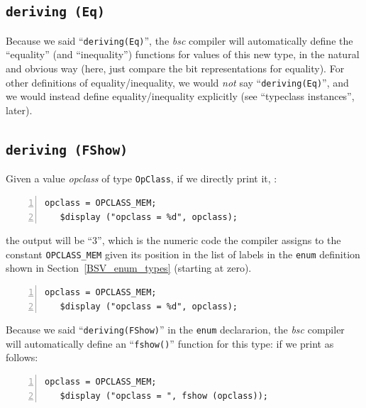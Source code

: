 
\subsection{{\tt deriving (Eq)}}


Because we said ``\verb|deriving(Eq)|'', the \emph{bsc} compiler will
automatically define the ``equality'' (and ``inequality'') functions
for values of this new type, in the natural and obvious way (here,
just compare the bit representations for equality).  For other
definitions of equality/inequality, we would \emph{not} say
``\verb|deriving(Eq)|'', and we would instead define
equality/inequality explicitly (see ``typeclass instances'', later).


\subsection{{\tt deriving (FShow)}}


Given a value \emph{opclass} of type \verb|OpClass|, if we directly
print it, {\eg}:

{\small
\begin{Verbatim}[frame=single, numbers=left]
   opclass = OPCLASS_MEM;
   $display ("opclass = %d", opclass);
\end{Verbatim}
}

the output will be ``3'', which is the numeric code the compiler
assigns to the constant \verb|OPCLASS_MEM| given its position in the
list of labels in the \verb|enum| definition shown in
Section~\ref{BSV_enum_types} (starting at zero).

{\small
\begin{Verbatim}[frame=single, numbers=left]
   opclass = OPCLASS_MEM;
   $display ("opclass = %d", opclass);
\end{Verbatim}
}

Because we said ``\verb|deriving(FShow)|'' in the \verb|enum|
declararion, the \emph{bsc} compiler will automatically define an
``\verb|fshow()|'' function for this type: if we print as follows:

{\small
\begin{Verbatim}[frame=single, numbers=left]
   opclass = OPCLASS_MEM;
   $display ("opclass = ", fshow (opclass));
\end{Verbatim}
}

